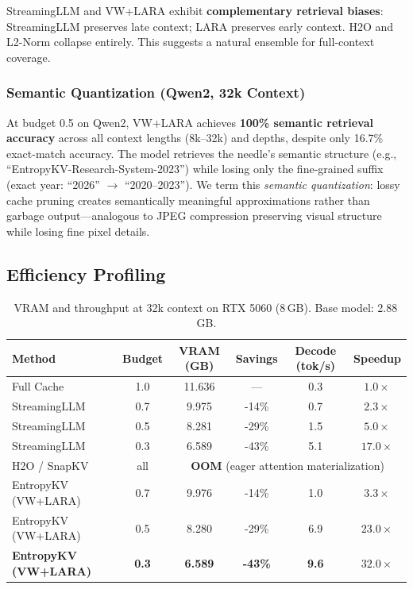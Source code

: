 \documentclass{article}
\begin{document}
StreamingLLM and VW+LARA exhibit \textbf{complementary retrieval biases}: StreamingLLM preserves late context; LARA preserves early context. H2O and L2-Norm collapse entirely. This suggests a natural ensemble for full-context coverage.

\subsubsection{Semantic Quantization (Qwen2, 32k Context)}

At budget 0.5 on Qwen2, VW+LARA achieves \textbf{100\% semantic retrieval accuracy} across all context lengths (8k--32k) and depths, despite only 16.7\% exact-match accuracy. The model retrieves the needle's semantic structure (e.g., ``EntropyKV-Research-System-2023'') while losing only the fine-grained suffix (exact year: ``2026'' $\rightarrow$ ``2020--2023''). We term this \emph{semantic quantization}: lossy cache pruning creates semantically meaningful approximations rather than garbage output---analogous to JPEG compression preserving visual structure while losing fine pixel details.

\subsection{Efficiency Profiling}

\begin{table}[h]
\centering
\caption{VRAM and throughput at 32k context on RTX 5060 (8\,GB). Base model: 2.88\,GB.}
\label{tab:profiling}
\begin{tabular}{lccccc}
\toprule
\textbf{Method} & \textbf{Budget} & \textbf{VRAM (GB)} & \textbf{Savings} & \textbf{Decode (tok/s)} & \textbf{Speedup} \\
\midrule
Full Cache & 1.0 & 11.636 & --- & 0.3 & $1.0\times$ \\
\midrule
StreamingLLM & 0.7 & 9.975 & -14\% & 0.7 & $2.3\times$ \\
StreamingLLM & 0.5 & 8.281 & -29\% & 1.5 & $5.0\times$ \\
StreamingLLM & 0.3 & 6.589 & -43\% & 5.1 & $17.0\times$ \\
\midrule
H2O / SnapKV & all & \multicolumn{4}{c}{\textbf{OOM} (eager attention materialization)} \\
\midrule
EntropyKV (VW+LARA) & 0.7 & 9.976 & -14\% & 1.0 & $3.3\times$ \\
EntropyKV (VW+LARA) & 0.5 & 8.280 & -29\% & 6.9 & $23.0\times$ \\
\textbf{EntropyKV (VW+LARA)} & \textbf{0.3} & \textbf{6.589} & \textbf{-43\%} & \textbf{9.6} & $\mathbf{32.0\times}$ \\
\bottomrule
\end{tabular}
\end{table}
\end{document}
